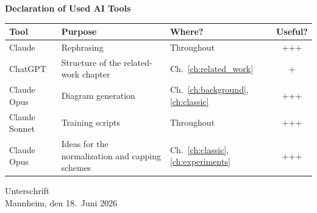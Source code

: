 \documentclass[a4paper,oneside,bibliography=totoc]{scrbook}
\begin{document}
\begin{center}
  \textbf{Declaration of Used AI Tools} \\[.3em]
  \begin{tabularx}{\textwidth}{lXlc}
    \toprule
    Tool & Purpose & Where? & Useful? \\
    \midrule
    Claude & Rephrasing & Throughout & +++ \\
    ChatGPT & Structure of the related-work chapter & Ch.~\ref{ch:related_work} & + \\
    Claude Opus & Diagram generation & Ch.~\ref{ch:background}, \ref{ch:classic} & +++ \\
    Claude Sonnet & Training scripts & Throughout & +++ \\
    Claude Opus & Ideas for the normalization and capping schemes & Ch.~\ref{ch:classic}, \ref{ch:experiments} & +++ \\
    \bottomrule
  \end{tabularx}
\end{center}

\vspace{2cm}
\noindent Unterschrift\\
\noindent Mannheim, den 18.~Juni 2026 \hfill
\end{document}

